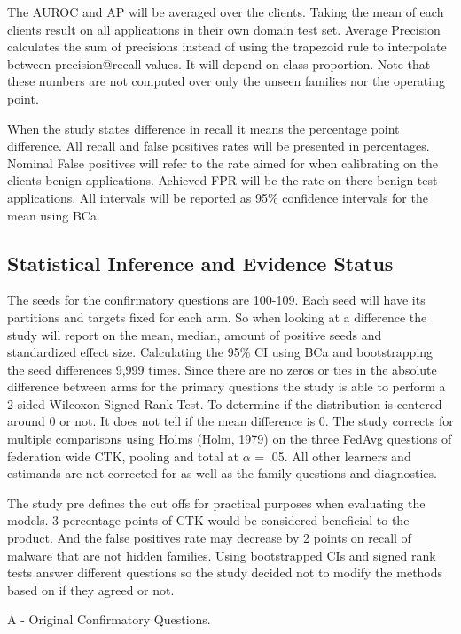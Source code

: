 \documentclass[12pt,letterpaper]{article}
\begin{document}
The AUROC and AP will be averaged over the clients. Taking the mean of each clients result on all applications in their own domain test set. Average Precision calculates the sum of precisions instead of using the trapezoid rule to interpolate between precision@recall values. It will depend on class proportion. Note that these numbers are not computed over only the unseen families nor the operating point.

When the study states difference in recall it means the percentage point difference. All recall and false positives rates will be presented in percentages. Nominal False positives will refer to the rate aimed for when calibrating on the clients benign applications. Achieved FPR will be the rate on there benign test applications. All intervals will be reported as 95\% confidence intervals for the mean using BCa.

\subsection*{Statistical Inference and Evidence Status} 

The seeds for the confirmatory questions are 100-109. Each seed will have its partitions and targets fixed for each arm. So when looking at a difference the study will report on the mean, median, amount of positive seeds and standardized effect size. Calculating the 95\% CI using BCa and bootstrapping the seed differences 9,999 times. Since there are no zeros or ties in the absolute difference between arms for the primary questions the study is able to perform a 2-sided Wilcoxon Signed Rank Test. To determine if the distribution is centered around 0 or not. It does not tell if the mean difference is 0. The study corrects for multiple comparisons using Holms (Holm, 1979) on the three FedAvg questions of federation wide CTK, pooling and total at $\alpha$ = .05. All other learners and estimands are not corrected for as well as the family questions and diagnostics.

The study pre defines the cut offs for practical purposes when evaluating the models. 3 percentage points of CTK would be considered beneficial to the product. And the false positives rate may decrease by 2 points on recall of malware that are not hidden families. Using bootstrapped CIs and signed rank tests answer different questions so the study decided not to modify the methods based on if they agreed or not.

A - Original Confirmatory Questions. 
\end{document}
